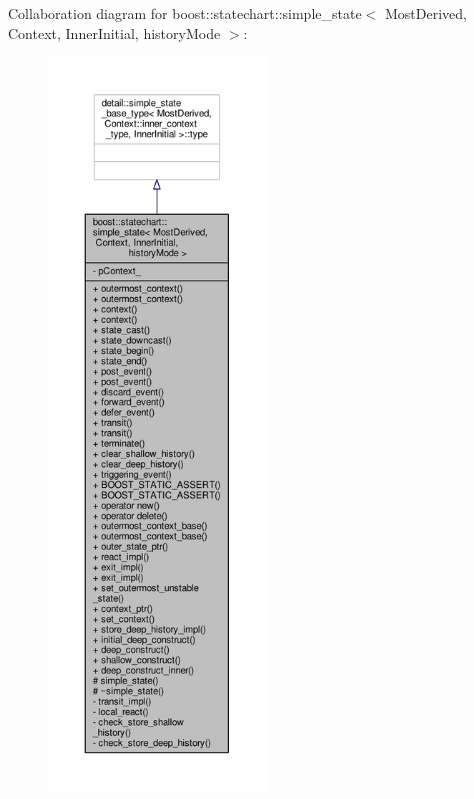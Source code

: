 Collaboration diagram for boost\+:\+:statechart\+:\+:simple\+\_\+state$<$ Most\+Derived, Context, Inner\+Initial, history\+Mode $>$\+:
\nopagebreak
\begin{figure}[H]
\begin{center}
\leavevmode
\includegraphics[height=550pt]{classboost_1_1statechart_1_1simple__state__coll__graph}
\end{center}
\end{figure}
